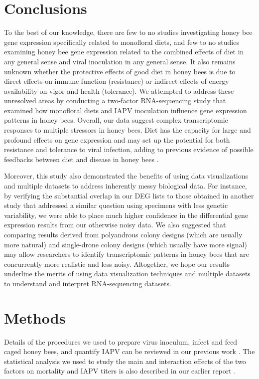 \documentclass{bmcart}
\begin{document}
\begin{linenumbers}
\begin{doublespacing}
\section*{Conclusions}

To the best of our knowledge, there are few to no studies investigating honey bee gene expression specifically related to monofloral diets, and few to no studies examining honey bee gene expression related to the combined effects of diet in any general sense and viral inoculation in any general sense. It also remains unknown whether the protective effects of good diet in honey bees is due to direct effects on immune function (resistance) or indirect effects of energy availability on vigor and health (tolerance). We attempted to address these unresolved areas by conducting a two-factor RNA-sequencing study that examined how monofloral diets and IAPV inoculation influence gene expression patterns in honey bees. Overall, our data suggest complex transcriptomic responses to multiple stressors in honey bees. Diet has the capacity for large and profound effects on gene expression and may set up the potential for both resistance and tolerance to viral infection, adding to previous evidence of possible feedbacks between diet and disease in honey bees \cite{AdamTothReview}. 

Moreover, this study also demonstrated the benefits of using data visualizations and multiple datasets to address inherently messy biological data. For instance, by verifying the substantial overlap in our DEG lists to those obtained in another study that addressed a similar question using specimens with less genetic variability, we were able to place much higher confidence in the differential gene expression results from our otherwise noisy data. We also suggested that comparing results derived from polyandrous colony designs (which are usually more natural) and single-drone colony designs (which usually have more signal) may allow researchers to identify transcriptomic patterns in honey bees that are concurrently more realistic and less noisy. Altogether, we hope our results underline the merits of using data visualization techniques and multiple datasets to understand and interpret RNA-sequencing datasets.

\section*{Methods}

Details of the procedures we used to prepare virus inoculum, infect and feed caged honey bees, and quantify IAPV can be reviewed in our previous work \cite{adamInt}. The statistical analysis we used to study the main and interaction effects of the two factors on mortality and IAPV titers is also described in our earlier report \cite{adamInt}.


\end{doublespacing}
\end{linenumbers}
\end{document}
